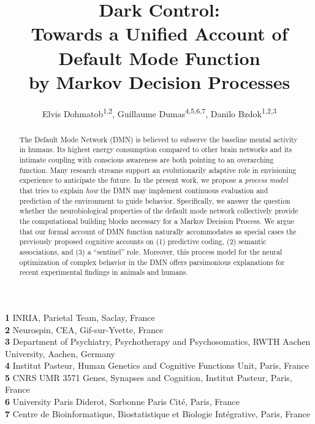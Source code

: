 \documentclass[10pt,letterpaper]{article}
\date{}
\title{Dark Control:\\
       Towards a Unified Account of Default Mode Function\\
       by Markov Decision Processes}
\begin{document}
\author{Elvis Dohmatob\textsuperscript{1,2}, Guillaume Dumas\textsuperscript{4,5,6,7}, Danilo Bzdok\textsuperscript{1,2,3}
}

\maketitle
\small{
    \textbf{1} INRIA, Parietal Team, Saclay, France\\
    \textbf{2} Neurospin, CEA, Gif-sur-Yvette, France\\
    \textbf{3} Department of Psychiatry, Psychotherapy and Psychosomatics, RWTH Aachen University, Aachen, Germany\\
    \textbf{4} Institut Pasteur, Human Genetics and Cognitive Functions Unit, Paris, France\\
    \textbf{5} CNRS UMR 3571 Genes, Synapses and Cognition, Institut Pasteur, Paris, France\\
    \textbf{6} University Paris Diderot, Sorbonne Paris Cit\'e, Paris, France\\
    \textbf{7} Centre de Bioinformatique, Biostatistique et Biologie Int\'egrative, Paris, France
}

\begin{abstract}
The Default Mode Network (DMN) is believed to subserve the
baseline mental activity in humans.
%
Its highest energy consumption compared to other brain networks and
its intimate coupling with conscious awareness are both pointing to
an overarching function.
%
Many research streams support an evolutionarily adaptive role in
envisioning experience to anticipate the future.
In the present work, we propose a \textit{process model}
that tries to explain \textit{how}
the DMN may implement
continuous evaluation and prediction of the environment to guide behavior.
%
%
Specifically, we answer the question whether the neurobiological properties of the default mode network collectively provide the computational building blocks necessary for a Markov Decision Process.
%
We argue that our formal account of DMN function naturally accommodates as special cases
the previously proposed cognitive accounts on
(1) predictive coding,
(2) semantic associations, and
(3) a ``sentinel'' role.
%
Moreover, this process model for the neural optimization of complex behavior in the DMN
offers parsimonious explanations for
recent experimental findings in animals and humans.
\end{abstract}
\end{document}
